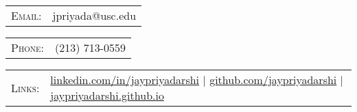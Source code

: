 \begin{tabular}{rl}
\textsc{Email:} & jpriyada@usc.edu\\
\end{tabular}
\hfill
\begin{tabular}{rl}
\textsc{\hspace{2.0cm}Phone:} & (213) 713-0559\\
\end{tabular}
\hfill

%
\begin{tabular}{rl}
\textsc{Links:} & \href{http://linkedin.com/in/jaypriyadarshi}{linkedin.com/in/jaypriyadarshi} \hspace{.5cm}|\hspace{.5cm} \href{http://github.com/jaypriyadarshi}{github.com/jaypriyadarshi}
\hspace{.5cm}|\hspace{.5cm} \href{https://jaypriyadarshi.github.io/}{jaypriyadarshi.github.io}
\end{tabular}
\vspace{5pt}
